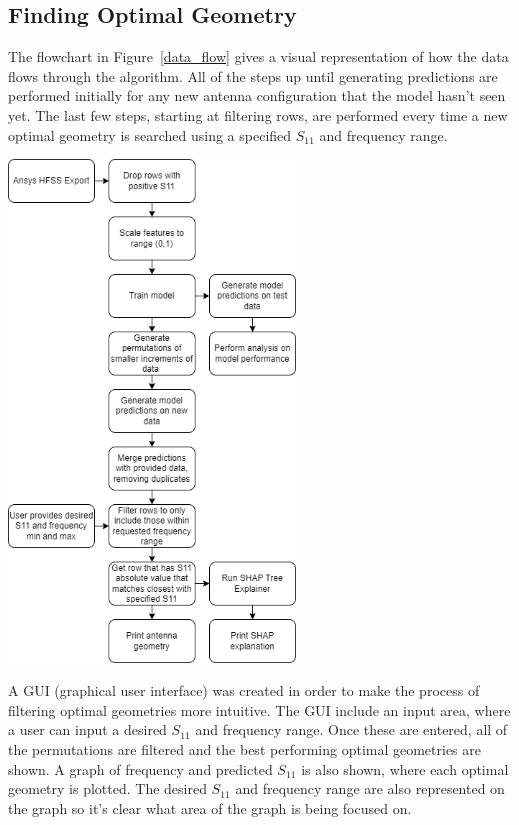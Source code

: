\documentclass[lettersize,journal]{IEEEtran}
\newenvironment{Figure}
    {\par\medskip\noindent\minipage{\linewidth}}
    {\endminipage\par\medskip}
\begin{document}
\subsection{Finding Optimal Geometry}
The flowchart in Figure~\ref{data_flow} gives a visual representation of how the data flows through the algorithm. All of the steps up until generating predictions are performed initially for any new antenna configuration that the model hasn't seen yet. The last few steps, starting at filtering rows, are performed every time a new optimal geometry is searched using a specified $S_{11}$ and frequency range. 

\begin{Figure}
\centering
\includegraphics[width=3.0in]{methodology}
\label{data_flow}
\end{Figure}

A GUI (graphical user interface) was created in order to make the process of filtering optimal geometries more intuitive. The GUI include an input area, where a user can input a desired $S_{11}$ and frequency range. Once these are entered, all of the permutations are filtered and the best performing optimal geometries are shown. A graph of frequency and predicted $S_{11}$ is also shown, where each optimal geometry is plotted. The desired $S_{11}$ and frequency range are also represented on the graph so it's clear what area of the graph is being focused on.
\end{document}
